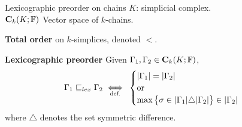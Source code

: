%	
%	
%	
%	
%	
%	

\begin{frame}{Lexicographic preorder on chains}
	$K$: simplicial complex.\\
	$\mathbf{C}_k(K; \mathbb{F})$ Vector space of $k$-chains.
	
	\textbf{Total order} on $k$-simplices, denoted $<$.
		
	\textbf{Lexicographic preorder} Given $\Gamma_1, \Gamma_2 \in \mathbf{C}_k(K; \mathbb{F})$,
		\[
		\Gamma_1 \sqsubseteq_{lex} \Gamma_2 \underset{\text{def.}}{\iff} \:
		\begin{cases} 
			|\Gamma_1| = |\Gamma_2| \\
			\operatorname{or} \\
			\max \big\{ \sigma \in |\Gamma_1| \triangle |\Gamma_2|  \big\}  \in |\Gamma_2|
		\end{cases}
		\]
		where $\triangle$ denotes the set symmetric difference.

%	
\end{frame}

